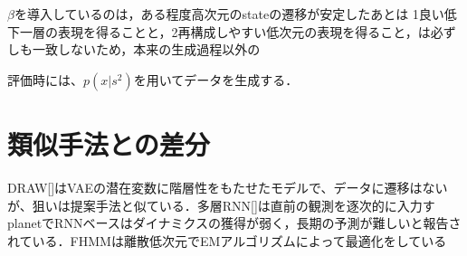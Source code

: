 $\beta$を導入しているのは，ある程度高次元のstateの遷移が安定したあとは
1良い低下一層の表現を得ることと，2再構成しやすい低次元の表現を得ること，は必ずしも一致しないため，本来の生成過程以外の



評価時には、$p(x|s^2)$を用いてデータを生成する．

\section{類似手法との差分}
DRAW[]はVAEの潜在変数に階層性をもたせたモデルで、データに遷移はないが、狙いは提案手法と似ている．多層RNN[]は直前の観測を逐次的に入力すplanetでRNNベースはダイナミクスの獲得が弱く，長期の予測が難しいと報告されている．FHMMは離散低次元でEMアルゴリズムによって最適化をしている


